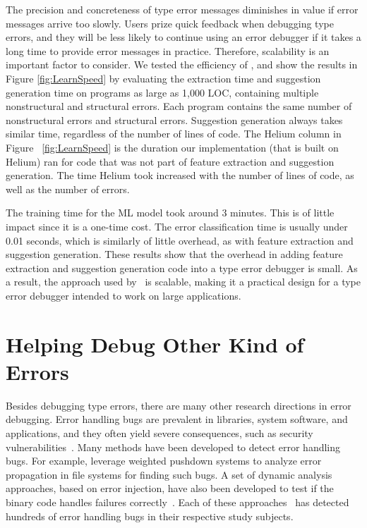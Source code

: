 \documentclass[12pt]{report}	%
\begin{document}
The precision and concreteness
of type error messages diminishes
in value if error messages
arrive too slowly. Users prize
quick feedback when debugging type errors,
and they will be less likely to continue using
an error debugger if it takes a long time
to provide error messages in practice.
Therefore, scalability is an important factor to consider. 
We tested the efficiency of \newCompiler,
and show the results in Figure \ref{fig:LearnSpeed} by evaluating
the extraction time and suggestion generation time on
programs as large as 1,000 LOC, containing multiple nonstructural
and structural errors. Each program contains the same number
of nonstructural errors and structural errors. 
%
Suggestion generation always takes
similar time, regardless of the number of lines of code.
%
The Helium column in Figure ~\ref{fig:LearnSpeed} is the duration
our implementation (that is built on
%
Helium) ran for code that was not part of feature extraction and suggestion
generation. 
%
The
time Helium took increased with the number of lines of code,
as well as the number of errors.

The training time for
the ML model took around 3
minutes. This is of little
impact since it is a one-time cost.
The error classification time
is usually under 0.01 seconds, 
which is similarly of
little overhead, as with
feature extraction and
suggestion generation.
These results show that the
overhead in adding feature extraction and suggestion generation code into
a type error debugger is small. 
As a result, the approach used by \newCompiler\
is scalable, making it a practical design for
a type error debugger intended to work on large applications.

\chapter{Helping Debug Other Kind of Errors}
\label{sec:app}


Besides debugging type errors, there are many other research directions in error debugging.
%
Error handling bugs are prevalent in libraries, system software, and
applications, and they often yield severe consequences, such as
security vulnerabilities~\cite{OWASP2007}.
%
Many methods have been developed to detect
error handling bugs. 
%
For example, \cite{Rubio-Gonzalez:2009:EPA:1542476.1542506} leverage weighted pushdown systems to analyze error propagation in file systems
for finding such bugs.
A set of dynamic analysis approaches, based on error injection, have also been developed 
to test if the binary code handles
failures correctly~\cite{marinescu2011efficient,susskraut2006automatically,gunawi2008eio}.
%
Each of these approaches~\cite{jana2016automatically,Rubio-Gonzalez:2009:EPA:1542476.1542506,gunawi2008eio} 
has detected hundreds of error handling bugs in their respective study subjects.
\end{document}
